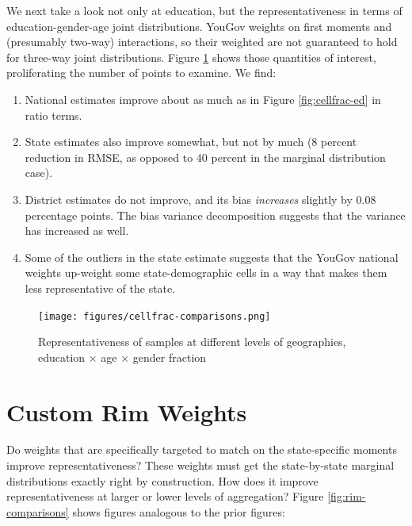 \documentclass[11pt]{article}
\begin{document}
\FloatBarrier

We next take a look not only at education, but the representativeness in terms of education-gender-age joint distributions. YouGov weights on first moments and (presumably two-way) interactions, so their weighted are not guaranteed to hold for three-way joint distributions.  Figure \ref{fig:cellfrac-ed-age-sex} shows those quantities of interest, proliferating the number of points to examine. We find:

\smallskip 
\begin{enumerate}
\item National estimates improve about as much as in Figure \ref{fig:cellfrac-ed} in ratio terms.
\item State estimates also improve somewhat, but not by much (8 percent reduction in RMSE, as opposed to 40 percent in the marginal distribution case).
\item District estimates do not improve, and its bias \emph{increases} slightly by 0.08 percentage points. The bias variance decomposition suggests that the variance has increased as well.
\item Some of the outliers in the state estimate suggests that the YouGov national weights up-weight some state-demographic cells in a way that makes them less representative of the state. 
\end{enumerate}

\begin{figure}[bt!h]
\centering
\caption{Representativeness of samples at different levels of geographies, education \(\times\) age \(\times\) gender fraction \label{fig:cellfrac-ed-age-sex}}
\texttt{[image: figures/cellfrac-comparisons.png]}
\end{figure}

\FloatBarrier
\newpage

\section*{Custom Rim Weights}

Do weights that are specifically targeted to match on the state-specific moments improve representativeness? These weights must get the state-by-state marginal distributions exactly right by construction. How does it improve representativeness at larger or lower levels of aggregation? Figure \ref{fig:rim-comparisons} shows figures analogous to the prior figures:
\end{document}
